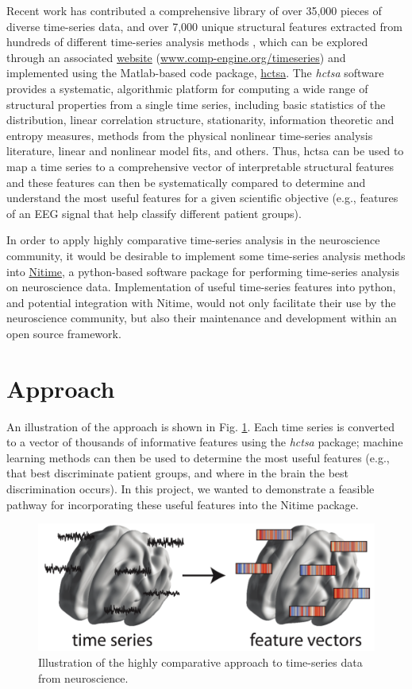 \documentclass[twocolumn]{bmcart}%
\begin{document}
Recent work has contributed a comprehensive library of over 35,000
pieces of diverse time-series data, and over 7,000 unique structural
features extracted from hundreds of different time-series analysis
methods \cite{Fulcher2013}, which can be explored through an associated
\href{www.comp-engine.org/timeseries}{website}
(\url{www.comp-engine.org/timeseries}) and implemented using the
Matlab-based code package,
\href{https://github.com/benfulcher/hctsa}{hctsa}. The \emph{hctsa}
software provides a systematic, algorithmic platform for computing a
wide range of structural properties from a single time series, including
basic statistics of the distribution, linear correlation structure,
stationarity, information theoretic and entropy measures, methods from
the physical nonlinear time-series analysis literature, linear and
nonlinear model fits, and others. Thus, hctsa can be used to map a time
series to a comprehensive vector of interpretable structural features
and these features can then be systematically compared to determine and
understand the most useful features for a given scientific objective
(e.g., features of an EEG signal that help classify different patient
groups).

In order to apply highly comparative time-series analysis in the
neuroscience community, it would be desirable to implement some
time-series analysis methods into
\href{http://nipy.org/nitime/}{Nitime}, a python-based software package
for performing time-series analysis on neuroscience data. Implementation
of useful time-series features into python, and potential integration
with Nitime, would not only facilitate their use by the neuroscience
community, but also their maintenance and development within an open
source framework.

\section{Approach}\label{approach}

An illustration of the approach is shown in Fig. \ref{centfig}. Each
time series is converted to a vector of thousands of informative
features using the \emph{hctsa} package; machine learning methods can
then be used to determine the most useful features (e.g., that best
discriminate patient groups, and where in the brain the best
discrimination occurs). In this project, we wanted to demonstrate a
feasible pathway for incorporating these useful features into the Nitime
package.

\begin{figure}[h!]
  \includegraphics[width=.47\textwidth]{nitime.png}
  \caption{\label{centfig} Illustration of the highly comparative approach to time-series data from neuroscience.}
\end{figure}
\end{document}
